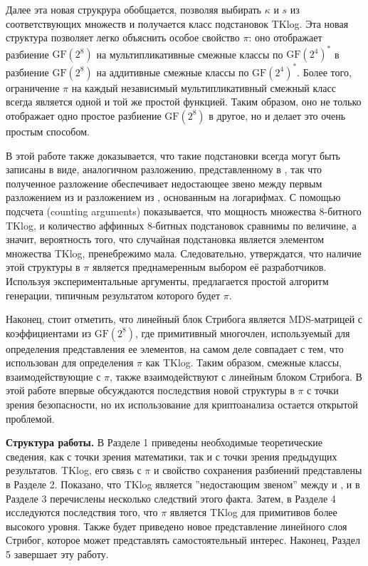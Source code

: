 Далее эта новая струкрура обобщается, позволяя выбирать \(\kappa\) и \(s\) из соответствующих множеств и получается класс подстановок TKlog. Эта новая структура позволяет легко объяснить особое свойство \(\pi\): оно отображает разбиение \(\text{GF}(2^8)\) на мультипликативные смежные классы по \(\text{GF}(2^4)^*\) в разбиение \(\text{GF}(2^8)\) на аддитивные смежные классы по \(\text{GF}(2^4)^*\). Более того, ограничение \(\pi\) на каждый независимый мультипликативный смежный класс всегда является одной и той же простой функцией. Таким образом, оно не только отображает одно простое разбиение \(\text{GF}(2^8)\) в другое, но и делает это очень простым способом.

В этой работе также доказывается, что такие подстановки всегда могут быть записаны в виде, аналогичном разложению, представленному в \cite{BPU16a}, так что полученное разложение обеспечивает недостающее звено между первым разложением из \cite{BPU16a} и разложением из \cite{PU16}, основанным на логарифмах. С помощью подсчета (counting arguments) показывается, что мощность множества 8-битного TKlog, и количество аффинных 8-битных подстановок сравнимы по величине, а значит, вероятность того, что случайная подстановка является элементом множества TKlog, пренебрежимо мала. Следовательно, утверждатся, что наличие этой структуры в \(\pi\) является преднамеренным выбором её разработчиков. Используя экспериментальные аргументы, предлагается простой алгоритм генерации, типичным результатом которого будет \(\pi\).

Наконец, стоит отметить, что линейный блок Стрибога является MDS-матрицей с коэффициентами из \(\text{GF}(2^8)\), где примитивный многочлен, используемый для определения представления ее элементов, на самом деле совпадает с тем, что использован для определения \(\pi\) как TKlog. Таким образом, смежные классы, взаимодействующие с \(\pi\), также взаимодействуют с линейным блоком Стрибога. В этой работе впервые обсуждаются последствия новой структуры в \(\pi\) с точки зрения безопасности, но их использование для криптоанализа остается открытой проблемой.

\textbf{Структура работы.} В Разделе 1 приведены необходимые теоретические сведения, как с точки зрения математики, так и с точки зрения предыдущих результатов. TKlog, его связь с \(\pi\) и свойство сохранения разбиений представлены в Разделе 2. Показано, что TKlog является ''недостающим звеном'' между \cite{BPU16a} и \cite{PU16}, и в Разделе 3 перечислены несколько следствий этого факта. Затем, в Разделе 4 исследуются последствия того, что \(\pi\) является TKlog для примитивов более высокого уровня. Также будет приведено новое представление линейного слоя Стрибог, которое может представлять самостоятельный интерес. Наконец, Раздел 5 завершает эту работу.
